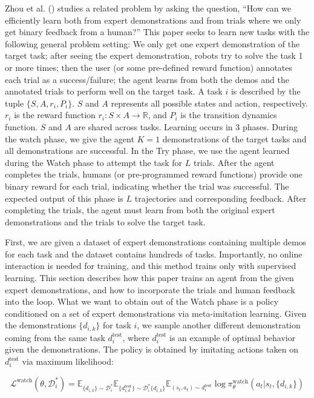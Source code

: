 \documentclass[
  letterpaper,
  numbers=noenddot,
  DIV=11]{scrreprt}
\theoremstyle{plain}
\theoremstyle{definition}
\theoremstyle{remark}
\begin{document}
Zhou et al. () studies a related
problem by asking the question, ``How can we efficiently learn both from
expert demonstrations and from trials where we only get binary feedback
from a human?'' This paper seeks to learn new tasks with the following
general problem setting: We only get one expert demonstration of the
target task; after seeing the expert demonstration, robots try to solve
the task 1 or more times; then the user (or some pre-defined reward
function) annotates each trial as a success/failure; the agent learns
from both the demos and the annotated trials to perform well on the
target task. A task \(i\) is described by the tuple
\(\{S, A, r_i, P_i\}\). \(S\) and \(A\) represents all possible states
and action, respectively. \(r_i\) is the reward function
\(r_i : S \times A \to \mathbb{R}\), and \(P_i\) is the transition
dynamics function. \(S\) and \(A\) are shared across tasks. Learning
occurs in 3 phases. During the watch phase, we give the agent \(K=1\)
demonstrations of the target tasks and all demonstrations are
successful. In the Try phase, we use the agent learned during the Watch
phase to attempt the task for \(L\) trials. After the agent completes
the trials, humans (or pre-programmed reward functions) provide one
binary reward for each trial, indicating whether the trial was
successful. The expected output of this phase is \(L\) trajectories and
corresponding feedback. After completing the trials, the agent must
learn from both the original expert demonstrations and the trials to
solve the target task.

First, we are given a dataset of expert demonstrations containing
multiple demos for each task and the dataset contains hundreds of tasks.
Importantly, no online interaction is needed for training, and this
method trains only with supervised learning. This section describes how
this paper trains an agent from the given expert demonstrations, and how
to incorporate the trials and human feedback into the loop. What we want
to obtain out of the Watch phase is a policy conditioned on a set of
expert demonstrations via meta-imitation learning. Given the
demonstrations \(\{d_{i,k}\}\) for task \(i\), we sample another
different demonstration coming from the same task \(d_i^{\text{test}}\),
where \(d_i^{\text{test}}\) is an example of optimal behavior given the
demonstrations. The policy is obtained by imitating actions taken on
\(d_i^{\text{test}}\) via maximum likelihood:

\[\mathcal{L}^\text{watch}(\theta, \mathcal{D}_i^*) = \mathbb{E}_{\{d_{i,k}\} \sim \mathcal{D}_i^*} \mathbb{E}_{\{d_{i,k}^{\text{test}}\} \sim \mathcal{D}_i^*  \{d_{i,k}\}} \mathbb{E}_{(s_t, a_t) \sim d_i^{\text{test}}} \log \pi_\theta^{\text{watch}} (a_t | s_t, \{d_{i,k}\})\]
\end{document}
